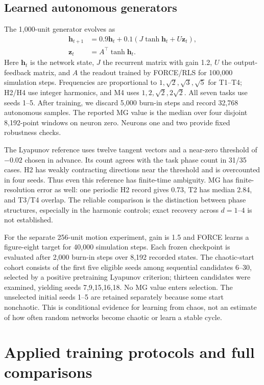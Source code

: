 {\subsection{Learned autonomous generators}
The 1,000-unit generator evolves as
\[
\begin{aligned}
\boldsymbol h_{t+1}&=0.9\boldsymbol h_t+
0.1(J\tanh\boldsymbol h_t+U\boldsymbol z_t),\\
\boldsymbol z_t&=A^\top\tanh\boldsymbol h_t.
\end{aligned}
\]
Here $\boldsymbol h_t$ is the network state, $J$ the recurrent matrix with gain 1.2, $U$ the output-feedback matrix, and $A$ the readout trained by FORCE/RLS for 100,000 simulation steps. Frequencies are proportional to $1,\sqrt2,\sqrt3,\sqrt5$ for T1--T4; H2/H4 use integer harmonics, and M4 uses $1,2,\sqrt2,2\sqrt2$. All seven tasks use seeds 1--5. After training, we discard 5,000 burn-in steps and record 32,768 autonomous samples. The reported MG value is the median over four disjoint 8,192-point windows on neuron zero. Neurons one and two provide fixed robustness checks.

The Lyapunov reference uses twelve tangent vectors and a near-zero threshold of $-0.02$ chosen in advance. Its count agrees with the task phase count in 31/35 cases. H2 has weakly contracting directions near the threshold and is overcounted in four seeds. Thus even this reference has finite-time ambiguity. MG has finite-resolution error as well: one periodic H2 record gives 0.73, T2 has median 2.84, and T3/T4 overlap. The reliable comparison is the distinction between phase structures, especially in the harmonic controls; exact recovery across $d=1$--$4$ is not established.

For the separate 256-unit motion experiment, gain is 1.5 and FORCE learns a figure-eight target for 40,000 simulation steps. Each frozen checkpoint is evaluated after 2,000 burn-in steps over 8,192 recorded states. The chaotic-start cohort consists of the first five eligible seeds among sequential candidates 6--30, selected by a positive pretraining Lyapunov criterion; thirteen candidates were examined, yielding seeds 7,9,15,16,18. No MG value enters selection. The unselected initial seeds 1--5 are retained separately because some start nonchaotic. This is conditional evidence for learning from chaos, not an estimate of how often random networks become chaotic or learn a stable cycle.

\section{Applied training protocols and full comparisons}\label{app:applied}
}
